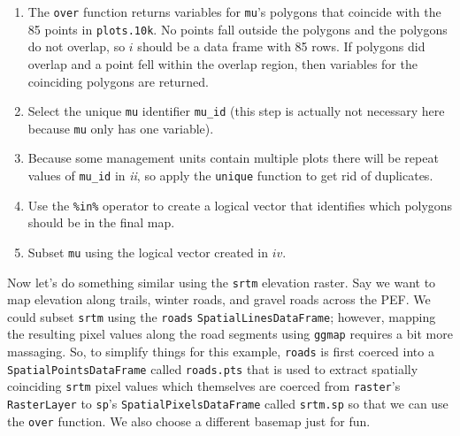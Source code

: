 \documentclass[]{krantz}
\makeatletter
\newenvironment{Shaded}{\begin{snugshade}}{\end{snugshade}}
\newcommand{\KeywordTok}[1]{\textcolor[rgb]{0.27,0.27,0.27}{\textbf{#1}}}
\newcommand{\StringTok}[1]{\textcolor[rgb]{0.5,0.5,0.5}{#1}}
\newcommand{\OperatorTok}[1]{\textcolor[rgb]{0.43,0.43,0.43}{\textbf{#1}}}
\newcommand{\NormalTok}[1]{#1}
\providecommand{\tightlist}{%
  \setlength{\itemsep}{0pt}\setlength{\parskip}{0pt}}
\newenvironment{kframe}{%
\medskip{}
\setlength{\fboxsep}{.8em}
 \def\at@end@of@kframe{}%
 \ifinner\ifhmode%
  \def\at@end@of@kframe{\end{minipage}}%
  \begin{minipage}{\columnwidth}%
 \fi\fi%
 \def\FrameCommand##1{\hskip\@totalleftmargin \hskip-\fboxsep
 \colorbox{shadecolor}{##1}\hskip-\fboxsep
     \hskip-\linewidth \hskip-\@totalleftmargin \hskip\columnwidth}%
 \MakeFramed {\advance\hsize-\width
   \@totalleftmargin\z@ \linewidth\hsize
   \@setminipage}}%
 {\par\unskip\endMakeFramed%
 \at@end@of@kframe}
\renewenvironment{Shaded}{\begin{kframe}}{\end{kframe}}
\theoremstyle{definition}
\theoremstyle{definition}
\theoremstyle{definition}
\theoremstyle{remark}
\makeatother
\begin{document}
\begin{Shaded}
\end{Shaded}

\begin{enumerate}
\def\labelenumi{\roman{enumi}.}
\tightlist
\item
  The \texttt{over} function returns variables for \texttt{mu}'s
  polygons that coincide with the 85 points in \texttt{plots.10k}. No
  points fall outside the polygons and the polygons do not overlap, so
  \(i\) should be a data frame with 85 rows. If polygons did overlap and
  a point fell within the overlap region, then variables for the
  coinciding polygons are returned.
\item
  Select the unique \texttt{mu} identifier \texttt{mu\_id} (this step is
  actually not necessary here because \texttt{mu} only has one
  variable).
\item
  Because some management units contain multiple plots there will be
  repeat values of \texttt{mu\_id} in \emph{ii}, so apply the
  \texttt{unique} function to get rid of duplicates.
\item
  Use the \texttt{\%in\%} operator to create a logical vector that
  identifies which polygons should be in the final map.
\item
  Subset \texttt{mu} using the logical vector created in \(iv\).
\end{enumerate}

Now let's do something similar using the \texttt{srtm} elevation raster.
Say we want to map elevation along trails, winter roads, and gravel
roads across the PEF. We could subset \texttt{srtm} using the
\texttt{roads} \texttt{SpatialLinesDataFrame}; however, mapping the
resulting pixel values along the road segments using \texttt{ggmap}
requires a bit more massaging. So, to simplify things for this example,
\texttt{roads} is first coerced into a \texttt{SpatialPointsDataFrame}
called \texttt{roads.pts} that is used to extract spatially coinciding
\texttt{srtm} pixel values which themselves are coerced from
\texttt{raster}'s \texttt{RasterLayer} to \texttt{sp}'s
\texttt{SpatialPixelsDataFrame} called \texttt{srtm.sp} so that we can
use the \texttt{over} function. We also choose a different basemap just
for fun.
\end{document}
